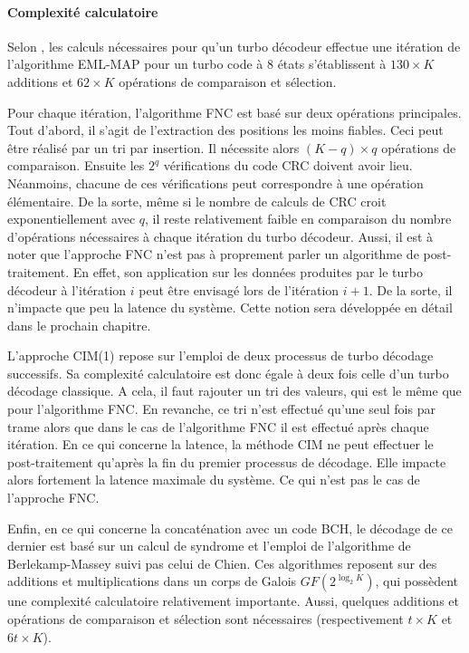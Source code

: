 \paragraph*{Complexité calculatoire} Selon \cite{david_gnaedig_thesis}, les calculs nécessaires pour qu'un turbo décodeur 
effectue une itération de l'algorithme EML-MAP pour un turbo code à 8 états s'établissent à $130\times K$ additions 
et $62\times K$ opérations de comparaison et sélection.

Pour chaque itération, l'algorithme FNC est basé sur deux opérations principales. Tout d'abord, il s'agit de l'extraction 
des positions les moins fiables. Ceci peut être réalisé par un tri par insertion. Il nécessite alors $(K-q)\times q$ 
opérations de comparaison. Ensuite les $2^q$ vérifications du code CRC doivent avoir lieu. 
Néanmoins, chacune de ces vérifications peut correspondre à une opération élémentaire.
De la sorte, même si le 
nombre de calculs de CRC croit exponentiellement avec $q$, il reste relativement faible en comparaison du nombre 
d'opérations nécessaires à chaque itération du turbo décodeur. 
Aussi, il est à noter que l'approche FNC n'est pas à proprement parler un algorithme 
de post-traitement. En effet, son application sur les données produites par le turbo décodeur à l'itération $i$ peut être 
envisagé lors de l'itération $i+1$.  De la sorte, il n'impacte que peu la latence du système. Cette notion sera développée 
en détail dans le prochain chapitre.

L'approche CIM(1) repose sur l'emploi de deux processus de turbo décodage successifs. Sa complexité calculatoire est donc
égale à deux fois celle d'un turbo décodage classique. A cela, il faut rajouter un tri des valeurs, qui est 
le même que pour l'algorithme FNC. En revanche, ce tri n'est effectué qu'une seul fois par trame alors que dans le cas de l'algorithme
FNC il est effectué après chaque itération. En ce qui concerne la latence, la méthode CIM ne 
peut effectuer le post-traitement qu'après la fin du premier processus de décodage. Elle impacte alors fortement la latence
maximale du système. Ce qui n'est pas le cas de l'approche FNC.

Enfin, en ce qui concerne la concaténation avec un code BCH, le décodage de ce dernier est basé sur un calcul 
de syndrome et  l'emploi de l'algorithme
de Berlekamp-Massey suivi pas celui de Chien. Ces algorithmes reposent sur des additions et multiplications dans un corps
de Galois $GF(2^{\log_2 K})$, qui possèdent une complexité calculatoire relativement importante. Aussi, quelques additions
et opérations de comparaison et sélection sont nécessaires (respectivement $t\times K$ et $6t\times K$). 

